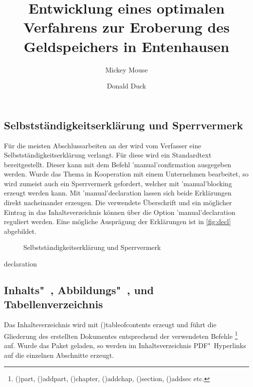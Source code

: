 \documentclass[%
  english,ngerman,%
  cdgeometry=no,DIV=12,%
  cd=false,cdfont=false,cdtitle=true,%
  headings=normal,%
  automark,%
  listof=toc,%
]{tudscrartcl}
\begin{document}
\subsection{Selbstständigkeitserklärung und Sperrvermerk}

Für die meisten Abschlussarbeiten an der \TnUD wird vom Verfasser eine 
Selbstständigkeitserklärung verlangt. Für diese wird ein Standardtext 
bereitgestellt. Dieser kann mit dem Befehl \Macro'manual'{confirmation} 
ausgegeben werden. Wurde das Thema in Kooperation mit einem Unternehmen 
bearbeitet, so wird zumeist auch ein Sperrvermerk gefordert, welcher mit 
\Macro'manual'{blocking} erzeugt werden kann. Mit \Macro'manual'{declaration} 
lassen sich beide Erklärungen direkt nacheinander erzeugen. Die verwendete 
Überschrift und ein möglicher Eintrag in das Inhaltsverzeichnis können über die 
Option \Option'manual'{declaration} reguliert werden. Eine mögliche Ausprägung 
der Erklärungen ist in \autoref{fig:decl} abgebildet.
%
\begin{figure}
\centering
{}
\caption{%
  Selbstständigkeitserklärung und Sperrvermerk%
  \label{fig:decl}%
}
\end{figure}

\begin{Hint!}{declaration}
\title{%
  Entwicklung eines optimalen Verfahrens zur Eroberung des
  Geldspeichers in Entenhausen
}
\author{Mickey Mouse\and Donald Duck}
\declaration[company=FIRMA]
\end{Hint!}
\begin{Trunk+}
\declaration[company=FIRMA]

\end{Trunk+}



\subsection{Inhalts"~, Abbildungs"~, und Tabellenverzeichnis}

Das Inhaltsverzeichnis wird mit \Macro(){tableofcontents} 
erzeugt und führt die Gliederung des erstellten Dokumentes entsprechend der 
verwendeten Befehle%
\footnote{%
  \Macro(){part},
  \Macro(){addpart}, 
  \Macro(){chapter}, 
  \Macro(){addchap}, 
  \Macro(){section},
  \Macro(){addsec} etc.%
}
auf. Wurde das Paket  geladen, so werden im 
Inhaltsverzeichnis PDF"~Hyperlinks auf die einzelnen Abschnitte erzeugt.
\end{document}

